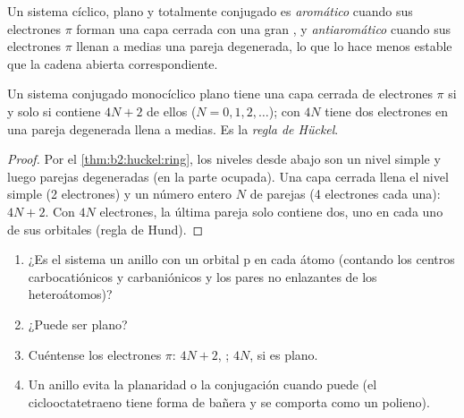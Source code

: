 \begin{definition}[Aromaticidad]\label{def:b2:huckel:aromatic}
Un sistema cíclico, plano y totalmente conjugado es \emph{aromático} cuando
sus electrones $\pi$ forman una capa cerrada con una gran , y
\emph{antiaromático} cuando sus electrones $\pi$ llenan a medias una pareja
degenerada, lo que lo hace menos estable que la cadena abierta correspondiente.
\end{definition}

\begin{theorem}\label{thm:b2:huckel:huckel-rule}
Un sistema conjugado monocíclico plano tiene una capa cerrada de electrones $\pi$ si y solo
si contiene $4N + 2$ de ellos ($N = 0, 1, 2, \dots$); con $4N$ tiene dos electrones en una
pareja degenerada llena a medias. Es la \emph{regla de Hückel}.
\end{theorem}

\begin{proof}
Por el \cref{thm:b2:huckel:ring}, los niveles desde abajo son un nivel simple y
luego parejas degeneradas (en la parte ocupada). Una capa cerrada llena el nivel
simple (2 electrones) y un número entero $N$ de parejas (4 electrones cada una): $4N + 2$. Con
$4N$ electrones, la última pareja solo contiene dos, uno en cada uno de sus orbitales (regla de
Hund).
\end{proof}

\begin{method}[¿Es aromático?]\label{met:b2:huckel:aromaticity}
\begin{enumerate}
  \item ¿Es el sistema un anillo con un orbital p en cada átomo (contando los centros
        carbocatiónicos y carbaniónicos y los pares no enlazantes de los heteroátomos)?
  \item ¿Puede ser plano?
  \item Cuéntense los electrones $\pi$: $4N + 2$, ; $4N$,  si es plano.
  \item Un anillo  evita la planaridad o la conjugación cuando puede
        (el ciclooctatetraeno tiene forma de bañera y se comporta como un polieno).
\end{enumerate}
\end{method}

